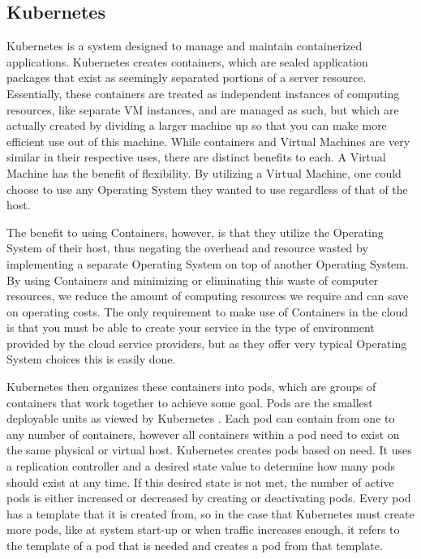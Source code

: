 \documentclass[thesis,proposal]{umassthesis}  %
\begin{document}
\subsection{Kubernetes}

Kubernetes is a system designed to manage and maintain containerized applications. Kubernetes creates containers, which are sealed application packages that exist as seemingly separated portions of a server resource. Essentially, these containers are treated as independent instances of computing resources, like separate VM instances, and are managed as such, but which are actually created by dividing a larger machine up so that you can make more efficient use out of this machine. While containers and Virtual Machines are very similar in their respective uses, there are distinct benefits to each. A Virtual Machine has the benefit of flexibility. By utilizing a Virtual Machine, one could choose to use any Operating System they wanted to use regardless of that of the host.\par

The benefit to using Containers, however, is that they utilize the Operating System of their host, thus negating the overhead and resource wasted by implementing a separate Operating System on top of another Operating System. By using Containers and minimizing or eliminating this waste of computer resources, we reduce the amount of computing resources we require and can save on operating costs. The only requirement to make use of Containers in the cloud is that you must be able to create your service in the type of environment provided by the cloud service providers, but as they offer very typical Operating System choices this is easily done.\par

Kubernetes then organizes these containers into pods, which are groups of containers that work together to achieve some goal. Pods are the smallest deployable units as viewed by Kubernetes \cite{openShiftGuidePods}. Each pod can contain from one to any number of containers, however all containers within a pod need to exist on the same physical or virtual host. Kubernetes creates pods based on need. It uses a replication controller and a desired state value to determine how many pods should exist at any time. If this desired state is not met, the number of active pods is either increased or decreased by creating or deactivating pods. Every pod has a template that it is created from, so in the case that Kubernetes must create more pods, like at system start-up or when traffic increases enough, it refers to the template of a pod that is needed and creates a pod from that template.\par
\end{document}
